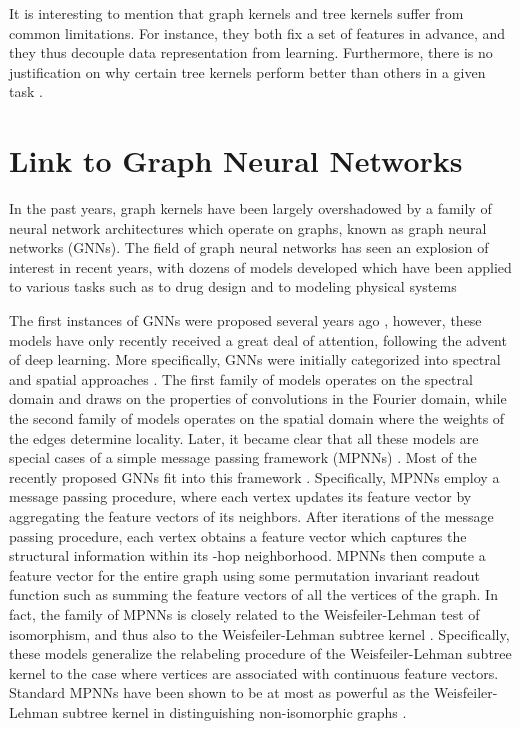 \documentclass[twoside,11pt]{article}
\begin{document}
It is interesting to mention that graph kernels and tree kernels suffer from common limitations.
For instance, they both fix a set of features in advance, and they thus decouple data representation from learning.
Furthermore, there is no justification on why certain tree kernels perform better than others in a given task .


\section{Link to Graph Neural Networks}\label{sec:gnns}
In the past years, graph kernels have been largely overshadowed by a family of neural network architectures which operate on graphs, known as graph neural networks (GNNs).
The field of graph neural networks has seen an explosion of interest in recent years, with dozens of models developed which have been applied to various tasks such as to drug design  and to modeling physical systems 

The first instances of GNNs were proposed several years ago , however, these models have only recently received a great deal of attention, following the advent of
deep learning.
More specifically, GNNs were initially categorized into spectral and spatial approaches .
The first family of models operates on the spectral domain and draws on the properties
of convolutions in the Fourier domain, while the second family of models operates on the spatial domain where the weights of the edges determine locality.
Later, it became clear that all these models are special cases of a simple message passing framework (MPNNs) .
Most of the recently proposed GNNs fit into this framework .
Specifically, MPNNs employ a message passing procedure, where each vertex updates its feature vector by aggregating the feature vectors of its neighbors.
After  iterations of the message passing procedure, each vertex obtains a feature vector which captures the structural information within its -hop neighborhood.
MPNNs then compute a feature vector for the entire graph using some permutation invariant readout function such as summing the feature vectors of all the vertices of the graph.
In fact, the family of MPNNs is closely related to the Weisfeiler-Lehman test of isomorphism, and thus also to the Weisfeiler-Lehman subtree kernel .
Specifically, these models generalize the relabeling procedure of the Weisfeiler-Lehman subtree kernel to the case where vertices are associated with continuous feature vectors.
Standard MPNNs have been shown to be at most as powerful as the Weisfeiler-Lehman subtree kernel in distinguishing non-isomorphic graphs .
\end{document}
